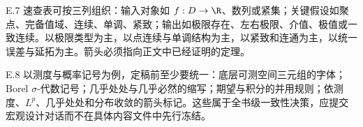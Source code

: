 \begin{solution}{E.7}
速查表可按三列组织：输入对象如 \(f:D\to\R\)、数列或紧集；关键假设如聚点、完备值域、连续、单调、紧致；输出如极限存在、左右极限、介值、极值或一致连续。以极限类型为主，以点连续与单调结构为主，以紧致和连通为主，以统一误差与延拓为主。箭头必须指向正文中已经证明的定理。
\end{solution}

\begin{solution}{E.8}
以测度与概率记号为例，定稿前至少要统一：底层可测空间三元组的字体；Borel \(\sigma\)-代数记号；几乎处处与几乎必然的缩写；期望与积分的并用规则；依测度、\(L^p\)、几乎处处和分布收敛的箭头标记。这些属于全书级一致性决策，应提交宏观设计对话而不在具体内容文件中先行冻结。
\end{solution}

